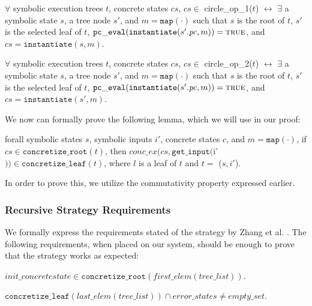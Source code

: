 \begin{definition}
$\forall$ symbolic execution trees $t$,  concrete states $cs$,
$cs \in$ circle\_op\_1($t$) $\leftrightarrow$ 
$\exists$ a symbolic state $s$, a tree node $s'$, and $m = \mathtt{map(\cdot)}$ such that
$s$ is the root of $t$, $s'$ is the selected leaf of $t$, 
$\mathtt{pc\_eval} (\mathtt{instantiate} (s'.\mathit{pc}, m)) = \mathtt{\textsc{true}}$, and 
$cs = \mathtt{instantiate}(s, m)$.
\end{definition}

\begin{definition}
$\forall$ symbolic execution trees $t$,  concrete states $cs$,
$cs \in$ circle\_op\_2($t$) $\leftrightarrow$ 
$\exists$ a symbolic state $s$, a tree node $s'$, and $m = \mathtt{map(\cdot)}$ such that
$s$ is the root of $t$, $s'$ is the selected leaf of $t$, 
$\mathtt{pc\_eval} (\mathtt{instantiate} (s'.\mathit{pc}, m)) = \mathtt{\textsc{true}}$, and 
$cs = \mathtt{instantiate}(s', m)$.
\end{definition}


We now can formally prove the following lemma, which we will use in our proof:
\begin{lemma} \label{cop}
forall symbolic states $s$, symbolic inputs $i'$, concrete states $c$, and $m = \mathtt{map(\cdot)}$,
if $cs \in \mathtt{concretize\_root}(t)$,
then 
$conc\_ex(cs, \mathtt{get\_input} ($i'$)) \in \mathtt{concretize\_leaf}(t)$,
where $l$ is a leaf of $t$ and $t = $ \symexecution($s, i'$).
\end{lemma}

In order to prove this, we utilize the commutativity property expressed earlier.


\subsubsection{Recursive Strategy Requirements}
We formally express the requirements stated of the strategy by Zhang et al. \cite{zhang2018recursive}.
The following requirements, when placed on our system, should be enough to prove that the strategy works as expected:

\setcounter{property}{0}
\renewcommand{\theproperty}{Z.\arabic{property}}
\begin{property}
  \label{prop:startinit}
$init\_concrete state \in \mathtt{concretize\_root}(first\_elem (tree\_list))$.
\end{property}

\begin{property}
  \label{prop:enderror}
$ \mathtt{concretize\_leaf} (last\_elem (tree\_list)) \cap error\_states 
\neq empty\_set $.
\end{property}

